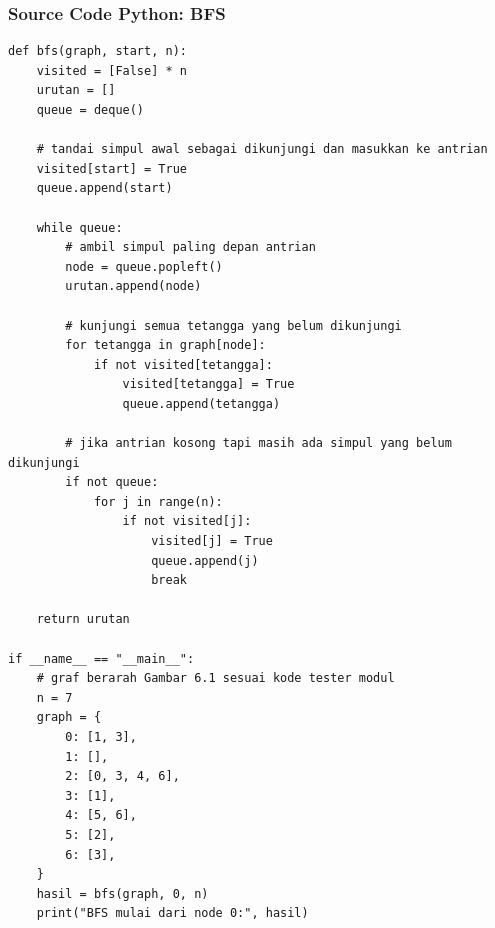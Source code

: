 \subsubsection*{Source Code Python: BFS}
\begin{lstlisting}[basicstyle=\ttfamily\scriptsize, frame=single, backgroundcolor=\color{white}, numbers=none, keywordstyle=\color{black}, commentstyle=\color{black}, stringstyle=\color{black}, breaklines=true]
def bfs(graph, start, n):
    visited = [False] * n
    urutan = []
    queue = deque()
    
    # tandai simpul awal sebagai dikunjungi dan masukkan ke antrian
    visited[start] = True
    queue.append(start)
    
    while queue:
        # ambil simpul paling depan antrian
        node = queue.popleft()
        urutan.append(node)
        
        # kunjungi semua tetangga yang belum dikunjungi
        for tetangga in graph[node]:
            if not visited[tetangga]:
                visited[tetangga] = True
                queue.append(tetangga)
                
        # jika antrian kosong tapi masih ada simpul yang belum dikunjungi
        if not queue:
            for j in range(n):
                if not visited[j]:
                    visited[j] = True
                    queue.append(j)
                    break
                    
    return urutan

if __name__ == "__main__":
    # graf berarah Gambar 6.1 sesuai kode tester modul
    n = 7
    graph = {
        0: [1, 3],
        1: [],
        2: [0, 3, 4, 6],
        3: [1],
        4: [5, 6],
        5: [2],
        6: [3],
    }
    hasil = bfs(graph, 0, n)
    print("BFS mulai dari node 0:", hasil)
\end{lstlisting}


